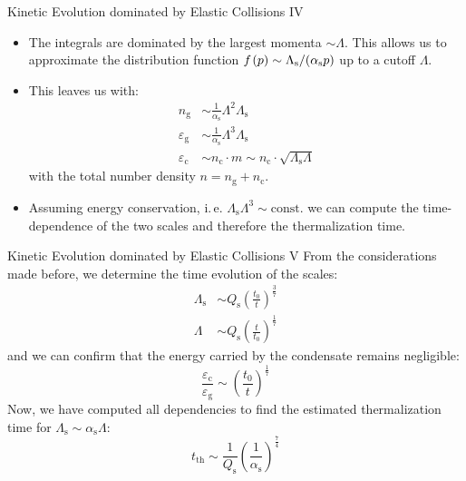 \begin{frame}{Kinetic Evolution dominated by Elastic Collisions IV}
\begin{itemize}
	\item The integrals are dominated by the largest momenta $\sim \Lambda$. This allows us to approximate the distribution function $f\hspace{0.1em}(p)\sim \Lambda_{\mathrm{s}}/(\alpha_{\mathrm{s}}p)$ up to a cutoff $\Lambda$.
	\item This leaves us with:
	\begin{align}
		n_{\mathrm{g}} &\sim \frac{1}{\alpha_{\mathrm{s}}}\Lambda^2\Lambda_{\mathrm{s}} \\
		\varepsilon_{\mathrm{g}} &\sim \frac{1}{\alpha_{\mathrm{s}}}\Lambda^3\Lambda_{\mathrm{s}}\\
		\varepsilon_{\mathrm{c}} &\sim n_{\mathrm{c}}\cdot m \sim n_{\mathrm{c}}\cdot\sqrt{\Lambda_{\mathrm{s}}\Lambda}
	\end{align}
	with the total number density $n = n_{\mathrm{g}} + n_{\mathrm{c}}$.
	\item Assuming \alert{energy conservation}, i.\,e. $\Lambda_{\mathrm{s}}\Lambda^3\sim \mathrm{const.}$ we can compute the time-dependence of the two scales and therefore the \alert{thermalization time}.
\end{itemize}
\end{frame}

\begin{frame}{Kinetic Evolution dominated by Elastic Collisions V}
From the considerations made before, we determine the time evolution of the scales:
\begin{align}
	\Lambda_{\mathrm{s}} &\sim  Q_{\mathrm{s}}\left(\frac{t_0}{t}\right)^{\frac{3}{7}} \\
	\Lambda &\sim  Q_{\mathrm{s}}\left(\frac{t}{t_0}\right)^{\frac{1}{7}}
\end{align}
and we can confirm that the energy carried by the condensate remains negligible:
\begin{equation}
	\frac{\varepsilon_{\mathrm{c}}}{\varepsilon_{\mathrm{g}}} \sim \left(\frac{t_0}{t}\right)^{\frac{1}{7}}
\end{equation}
Now, we have computed all dependencies to find the estimated \alert{thermalization time} for $\Lambda_{\mathrm{s}}\sim\alpha_{\mathrm{s}}\Lambda$:
\begin{equation}
	t_{\mathrm{th}} \sim \frac{1}{Q_{\mathrm{s}}}\left(\frac{1}{\alpha_{\mathrm{s}}}\right)^{\frac{7}{4}}
\end{equation}
\end{frame}


